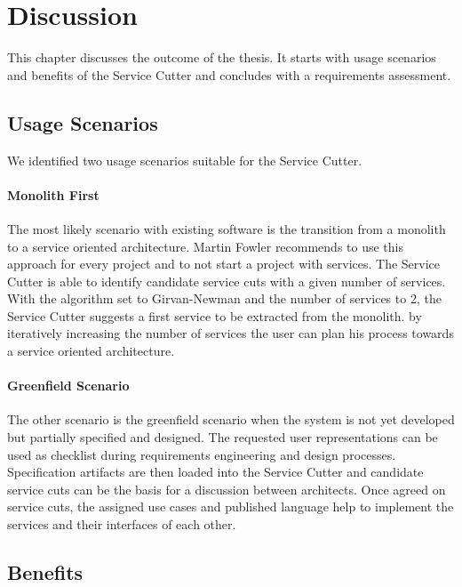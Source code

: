 \chapter{Discussion}

This chapter discusses the outcome of the thesis. It starts with usage scenarios and benefits of the Service Cutter and concludes with a requirements assessment.

\section{Usage Scenarios}

We identified two usage scenarios suitable for the Service Cutter.

\subsubsection{Monolith First}
\label{subsec:monolithFirst}

The most likely scenario with existing software is the transition from a monolith to a service oriented architecture. Martin Fowler recommends to use this approach for every project and to not start a project with services\cite{fowlerMonolithFirst}. The Service Cutter is able to identify candidate service cuts with a given number of services. With the algorithm set to Girvan-Newman and the number of services to 2, the Service Cutter suggests a first service to be extracted from the monolith. by iteratively increasing the number of services the user can plan his process towards a service oriented architecture.

\subsubsection{Greenfield Scenario}

The other scenario is the greenfield scenario when the system is not yet developed but partially specified and designed. The requested user representations can be used as checklist during requirements engineering and design processes. Specification artifacts are then loaded into the Service Cutter and candidate service cuts can be the basis for a discussion between architects. Once agreed on service cuts, the assigned use cases and published language help to implement the services and their interfaces of each other. 

\clearpage

\section{Benefits}

